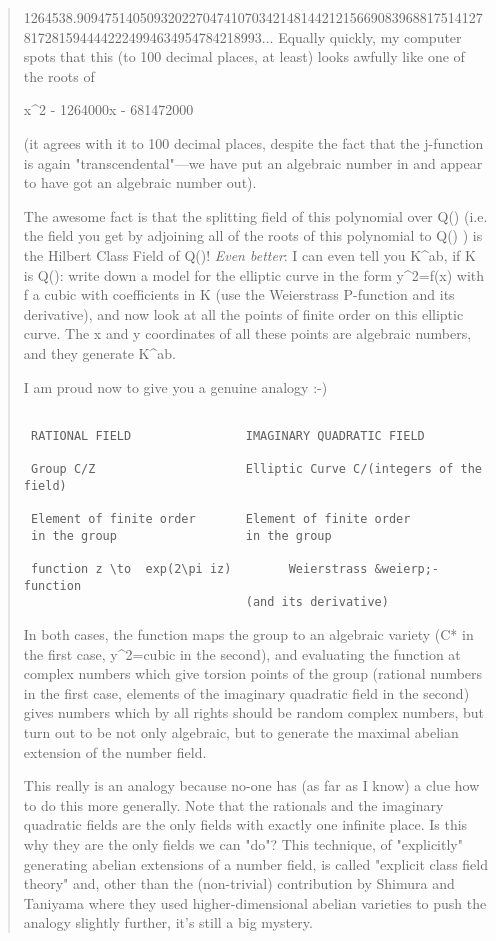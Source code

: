 \begin{quote}
 1264538.90947514050932022704741070342148144212156690839688175141278172815944442224994634954784218993...
 Equally quickly, my computer spots that this (to 100 decimal places,
 at least) looks awfully like one of the roots of
 
 x^{2} - 1264000x - 681472000
 
 (it agrees with it to 100 decimal places, despite the fact that the j-function
 is again "transcendental"---we have put an algebraic number in and appear
 to have got an algebraic number out).

 The awesome fact is that the splitting field of this polynomial
 over Q() (i.e. the field you get by adjoining all of the roots
 of this polynomial to Q() ) is the Hilbert Class Field of 
 Q()!
 \emph{Even better}: 
 I can even tell you K^{ab}, if K is Q(): write
 down a model for the elliptic curve in the form y^{2}=f(x) 
 with f a cubic
 with coefficients in K (use the Weierstrass P-function and its
 derivative), and now look at all the points of finite order
 on this elliptic curve. The x and y coordinates of all these points
 are algebraic numbers, and they generate K^{ab}.
 
 I am proud now to give you a genuine analogy :-)
 

\begin{verbatim}

 RATIONAL FIELD                IMAGINARY QUADRATIC FIELD

 Group C/Z                     Elliptic Curve C/(integers of the field)

 Element of finite order       Element of finite order 
 in the group                  in the group

 function z \to  exp(2\pi iz)        Weierstrass &weierp;-function 
                               (and its derivative)
\end{verbatim}
    

 In both cases, the function maps the group to an algebraic variety
 (C* in the first case, y^{2}=cubic in the second), and evaluating
 the function at complex numbers which give torsion points of the group
 (rational numbers in the first case, elements of the imaginary quadratic
 field in the
 second) gives numbers which by all rights should be random complex numbers,
 but turn out to be not only algebraic, but to generate the maximal abelian
 extension of the number field.


 This really is an analogy because no-one has (as far as I know) a clue how
 to do this more generally. Note that the rationals and the imaginary quadratic
 fields are the only fields with exactly one infinite place. Is this why
 they are the only fields we can "do"? This technique, of 
 "explicitly"
 generating abelian extensions of a number field, is called "explicit 
 class field theory" and, other than the (non-trivial) contribution by 
 Shimura and Taniyama where they used higher-dimensional abelian varieties 
 to push the analogy slightly further, it's still a big mystery.



\end{quote}
